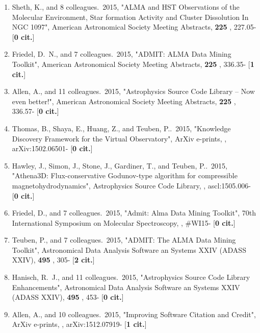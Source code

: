 \documentclass[11pt,letterpaper]{article}
\begin{document}
\begin{enumerate}[resume,label=\textbf{\arabic*}.]
\item  
Sheth, K., and 8 colleagues.\  2015,  "ALMA and HST Observations of the 
Molecular Environment, Star formation Activity and Cluster Dissolution In 
NGC 1097", American Astronomical Society Meeting Abstracts,  {\bf 225} , 
227.05- [{\bf 0 cit.}] 

\item  
Friedel, D.~N., and 7 colleagues.\  2015,  "ADMIT: ALMA Data Mining 
Toolkit", American Astronomical Society Meeting Abstracts,  {\bf 225} , 
336.35- [{\bf 1 cit.}] 

\item  
Allen, A., and 11 colleagues.\  2015,  "Astrophysics Source Code Library -- 
Now even better!", American Astronomical Society Meeting Abstracts,  {\bf 
225} , 336.57- [{\bf 0 cit.}] 

\item  
Thomas, B., Shaya, E., Huang, Z., and Teuben, P..\  2015,  "Knowledge 
Discovery Framework for the Virtual Observatory", ArXiv e-prints,  , 
arXiv:1502.06501- [{\bf 0 cit.}] 

\item  
Hawley, J., Simon, J., Stone, J., Gardiner, T., and Teuben, P..\  2015,  
"Athena3D: Flux-conservative Godunov-type algorithm for compressible 
magnetohydrodynamics", Astrophysics Source Code Library,  , ascl:1505.006- 
[{\bf 0 cit.}] 

\item  
Friedel, D., and 7 colleagues.\  2015,  "Admit: Alma Data Mining Toolkit", 
70th International Symposium on Molecular Spectroscopy,  , \#WI15- [{\bf 0 
cit.}] 

\item  
Teuben, P., and 7 colleagues.\  2015,  "ADMIT: The ALMA Data Mining 
Toolkit", Astronomical Data Analysis Software an Systems XXIV (ADASS XXIV),  
{\bf 495} , 305- [{\bf 2 cit.}] 

\item  
Hanisch, R.~J., and 11 colleagues.\  2015,  "Astrophysics Source Code 
Library Enhancements", Astronomical Data Analysis Software an Systems XXIV 
(ADASS XXIV),  {\bf 495} , 453- [{\bf 0 cit.}] 

\item  
Allen, A., and 10 colleagues.\  2015,  "Improving Software Citation and 
Credit", ArXiv e-prints,  , arXiv:1512.07919- [{\bf 1 cit.}] 


\end{enumerate}
\end{document}
